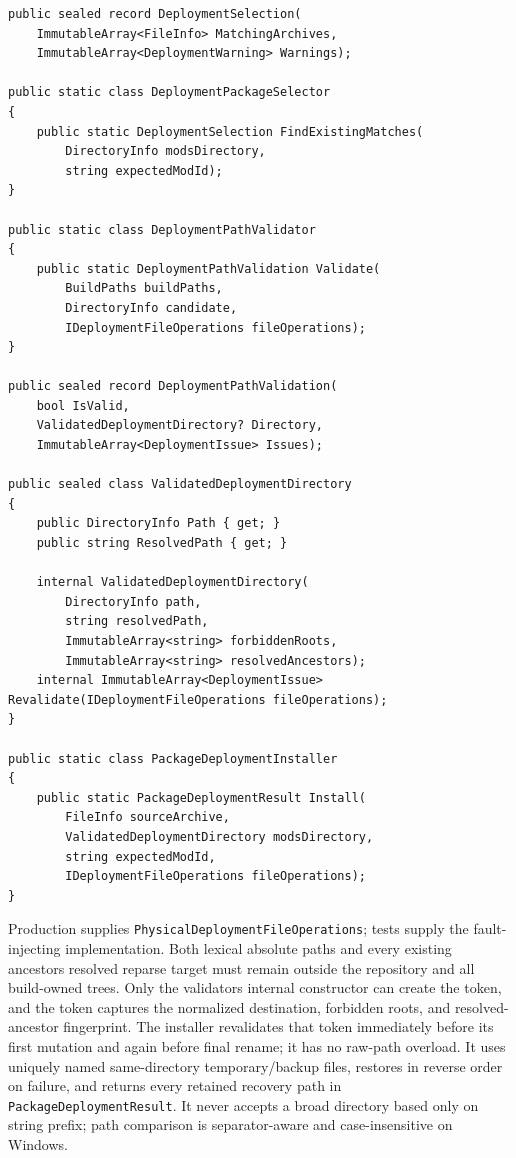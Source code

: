 \documentclass[
  10pt,
  letterpaper,
]{article}
\newcommand{\passthrough}[1]{#1}
\begin{document}
\begin{lstlisting}
public sealed record DeploymentSelection(
    ImmutableArray<FileInfo> MatchingArchives,
    ImmutableArray<DeploymentWarning> Warnings);

public static class DeploymentPackageSelector
{
    public static DeploymentSelection FindExistingMatches(
        DirectoryInfo modsDirectory,
        string expectedModId);
}

public static class DeploymentPathValidator
{
    public static DeploymentPathValidation Validate(
        BuildPaths buildPaths,
        DirectoryInfo candidate,
        IDeploymentFileOperations fileOperations);
}

public sealed record DeploymentPathValidation(
    bool IsValid,
    ValidatedDeploymentDirectory? Directory,
    ImmutableArray<DeploymentIssue> Issues);

public sealed class ValidatedDeploymentDirectory
{
    public DirectoryInfo Path { get; }
    public string ResolvedPath { get; }

    internal ValidatedDeploymentDirectory(
        DirectoryInfo path,
        string resolvedPath,
        ImmutableArray<string> forbiddenRoots,
        ImmutableArray<string> resolvedAncestors);
    internal ImmutableArray<DeploymentIssue> Revalidate(IDeploymentFileOperations fileOperations);
}

public static class PackageDeploymentInstaller
{
    public static PackageDeploymentResult Install(
        FileInfo sourceArchive,
        ValidatedDeploymentDirectory modsDirectory,
        string expectedModId,
        IDeploymentFileOperations fileOperations);
}
\end{lstlisting}

Production supplies \texttt{PhysicalDeploymentFileOperations}; tests
supply the fault-injecting implementation. Both lexical absolute paths
and every existing ancestor\textquotesingle s resolved reparse target
must remain outside the repository and all build-owned trees. Only the
validator\textquotesingle s internal constructor can create the token,
and the token captures the normalized destination, forbidden roots, and
resolved-ancestor fingerprint. The installer revalidates that token
immediately before its first mutation and again before final rename; it
has no raw-path overload. It uses uniquely named same-directory
temporary/backup files, restores in reverse order on failure, and
returns every retained recovery path in
\passthrough{\lstinline!PackageDeploymentResult!}. It never accepts a
broad directory based only on string prefix; path comparison is
separator-aware and case-insensitive on Windows.
\end{document}
